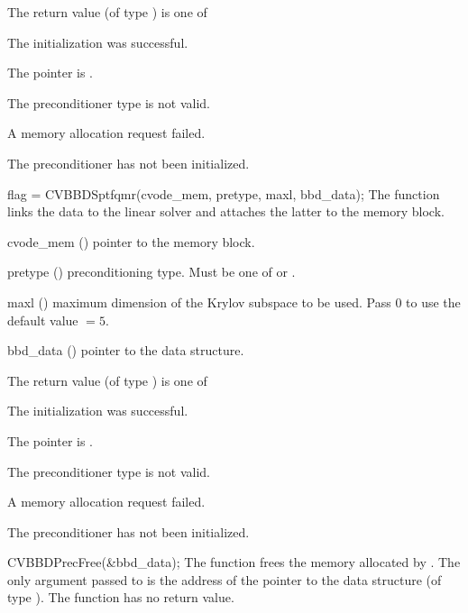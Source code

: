 {
  The return value  (of type ) is one of
  \begin{args}
  \item[\Id{CVSPBCG\_SUCCESS}] 
    The {\cvspbcg} initialization was successful.
  \item[\Id{CVSPBCG\_MEM\_NULL}]
    The  pointer is .
  \item[\Id{CVSPBCG\_ILL\_INPUT}]
    The preconditioner type  is not valid.
  \item[\Id{CVSPBCG\_MEM\_FAIL}]
    A memory allocation request failed.
  \item[\Id{CVBBDPRE\_PDATA\_NULL}]
    The {\cvbbdpre} preconditioner has not been initialized.
  \end{args}
}
{}
{
  flag = CVBBDSptfqmr(cvode\_mem, pretype, maxl, bbd\_data);
}
{
  The function  links the {\cvbbdpre} data to the
  {\cvsptfqmr} linear solver and attaches the latter to the {\cvodes}
  memory block.
}
{
  \begin{args}
  \item[cvode\_mem] ()
    pointer to the {\cvodes} memory block.
  \item[pretype] ()
    preconditioning type. Must be one of  or .
  \item[maxl] ()
    maximum dimension of the Krylov subspace to be used. Pass $0$ to use the 
    default value  $= 5$.
  \item[bbd\_data] ()
    pointer to the {\cvbbdpre} data structure.
  \end{args}
}
{
  The return value  (of type ) is one of
  \begin{args}
  \item[\Id{CVSPTFQMR\_SUCCESS}] 
    The {\cvsptfqmr} initialization was successful.
  \item[\Id{CVSPTFQMR\_MEM\_NULL}]
    The  pointer is .
  \item[\Id{CVSPTFQMR\_ILL\_INPUT}]
    The preconditioner type  is not valid.
  \item[\Id{CVSPTFQMR\_MEM\_FAIL}]
    A memory allocation request failed.
  \item[\Id{CVBBDPRE\_PDATA\_NULL}]
    The {\cvbbdpre} preconditioner has not been initialized.
  \end{args}
}
{}
{
  CVBBDPrecFree(\&bbd\_data);
}
{
  The function  frees the memory allocated by
  .
}
{
  The only argument passed to  is the address of the pointer
  to the {\cvbbdpre} data structure (of type ).
}
{
  The function  has no return value.
}
{}


